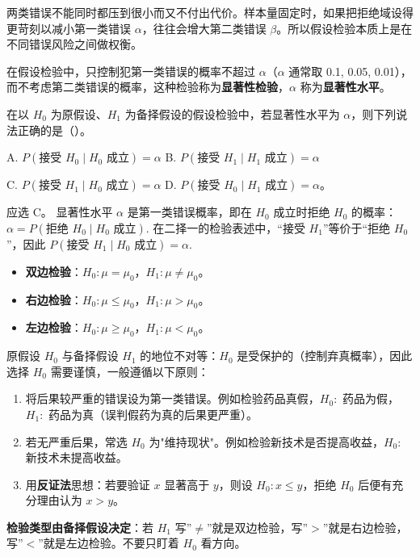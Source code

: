 \documentclass[lang=cn,11pt]{elegantbook}
\begin{document}
\begin{note}
两类错误不能同时都压到很小而又不付出代价。样本量固定时，如果把拒绝域设得更苛刻以减小第一类错误 \(\alpha\)，往往会增大第二类错误 \(\beta\)。所以假设检验本质上是在不同错误风险之间做权衡。
\end{note}

\begin{definition}[显著性水平与显著性检验] \label{def:significance-level}
在假设检验中，只控制犯第一类错误的概率不超过 \(\alpha\)（\(\alpha\) 通常取 0.1, 0.05, 0.01），而不考虑第二类错误的概率，这种检验称为\textbf{显著性检验}，\(\alpha\) 称为\textbf{显著性水平}。
\end{definition}
\begin{exercise}\label{exer:src-paper3-ii-05}\label{prob:p3-ii-05}
在以 \(H_0\) 为原假设、\(H_1\) 为备择假设的假设检验中，若显著性水平为 \(\alpha\)，则下列说法正确的是（\quad）。\par
A. \(P(\text{接受 }H_0\mid H_0\text{ 成立})=\alpha\)\quad
B. \(P(\text{接受 }H_1\mid H_1\text{ 成立})=\alpha\)\par
C. \(P(\text{接受 }H_1\mid H_0\text{ 成立})=\alpha\)\quad
D. \(P(\text{接受 }H_0\mid H_1\text{ 成立})=\alpha\)。
\end{exercise}
\begin{solution}
应选 C。
显著性水平 \(\alpha\) 是第一类错误概率，即在 \(H_0\) 成立时拒绝 \(H_0\) 的概率：
\(
\alpha=P(\text{拒绝 }H_0\mid H_0\text{ 成立}).
\)
在二择一的检验表述中，“接受 \(H_1\)”等价于“拒绝 \(H_0\)”，因此
\(
P(\text{接受 }H_1\mid H_0\text{ 成立})=\alpha.
\)
\end{solution}

\begin{definition}[双边检验与单边检验]\label{def:ht-types}
\begin{itemize}
    \item \textbf{双边检验}：\(H_0\colon \mu = \mu_0\)，\(H_1\colon \mu \neq \mu_0\)。
    \item \textbf{右边检验}：\(H_0\colon \mu \leq \mu_0\)，\(H_1\colon \mu > \mu_0\)。
    \item \textbf{左边检验}：\(H_0\colon \mu \geq \mu_0\)，\(H_1\colon \mu < \mu_0\)。
\end{itemize}
原假设 \(H_0\) 与备择假设 \(H_1\) 的地位不对等：\(H_0\) 是受保护的（控制弃真概率），因此选择 \(H_0\) 需要谨慎，一般遵循以下原则：
\begin{enumerate}
    \item 将后果较严重的错误设为第一类错误。例如检验药品真假，\(H_0\colon\) 药品为假，\(H_1\colon\) 药品为真（误判假药为真的后果更严重）。
    \item 若无严重后果，常选 \(H_0\) 为"维持现状"。例如检验新技术是否提高收益，\(H_0\colon\) 新技术未提高收益。
    \item 用\textbf{反证法}思想：若要验证 \(x\) 显著高于 \(y\)，则设 \(H_0\colon x \leq y\)，拒绝 \(H_0\) 后便有充分理由认为 \(x > y\)。
\end{enumerate}
\textbf{检验类型由备择假设决定}：若 \(H_1\) 写”\(\neq\)”就是双边检验，写”\(>\)”就是右边检验，写”\(<\)”就是左边检验。不要只盯着 \(H_0\) 看方向。
\end{definition}
\end{document}

